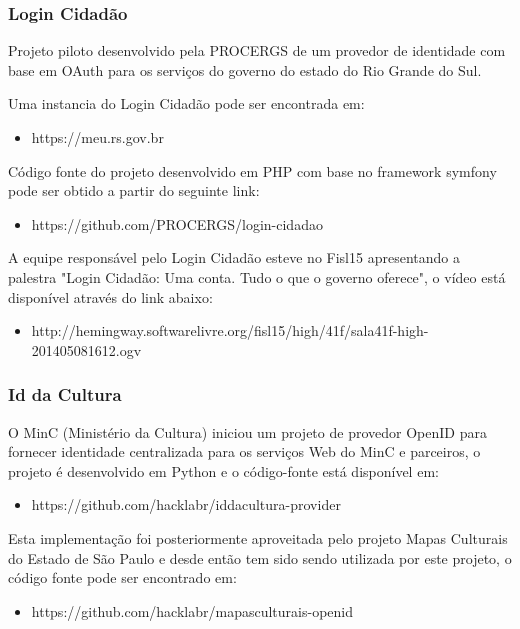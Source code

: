\documentclass[11pt]{article}
\begin{document}
\subsubsection{Login Cidadão}

Projeto piloto desenvolvido pela PROCERGS de um provedor de identidade com
base em OAuth para os serviços do governo do estado do Rio Grande do Sul.

Uma instancia do Login Cidadão pode ser encontrada em:

\begin{itemize}
  \item{https://meu.rs.gov.br}
\end{itemize}

Código fonte do projeto desenvolvido em PHP com base no framework symfony pode
ser obtido a partir do seguinte link:

\begin{itemize}
  \item{https://github.com/PROCERGS/login-cidadao}
\end{itemize}

A equipe responsável pelo Login Cidadão esteve no Fisl15 apresentando a
palestra "Login Cidadão: Uma conta. Tudo o que o governo oferece", o vídeo
está disponível através do link abaixo:

\begin{itemize}
  \item{http://hemingway.softwarelivre.org/fisl15/high/41f/sala41f-high-201405081612.ogv}
\end{itemize}

\subsubsection{Id da Cultura}

O MinC (Ministério da Cultura) iniciou um projeto de provedor OpenID para
fornecer identidade centralizada para os serviços Web do MinC e parceiros, o
projeto é desenvolvido em Python e o código-fonte está disponível em:
\begin{itemize}
  \item{https://github.com/hacklabr/iddacultura-provider}
\end{itemize}

Esta implementação foi posteriormente aproveitada pelo projeto Mapas Culturais
do Estado de São Paulo e desde então tem sido sendo utilizada por este
projeto, o código fonte pode ser encontrado em:

\begin{itemize}
  \item{https://github.com/hacklabr/mapasculturais-openid}
\end{itemize}
\end{document}
